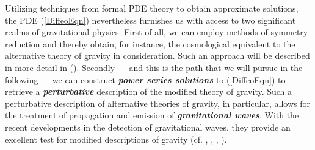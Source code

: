\documentclass[%
 reprint,
nofootinbib,
 amsmath,amssymb,
 aps,
 prd,
floatfix,
]{revtex4-2}
\begin{document}
Utilizing techniques from formal PDE theory to obtain approximate solutions, the PDE (\ref{DiffeoEqn}) nevertheless furnishes us with access to two significant realms of gravitational physics. First of all, we can employ methods of symmetry reduction and thereby obtain, for instance, the cosmological equivalent to the alternative theory of gravity in consideration. Such an approach will be described in more detail in (\cite{NilsPHD}).
Secondly --- and this is the path that we will pursue in the following --- we can construct \textit{\textbf{power series solutions}} to (\ref{DiffeoEqn}) to retrieve a \textbf{\textit{perturbative}} description of the modified theory of gravity. Such a perturbative description of alternative theories of gravity, in particular, allows for the treatment of propagation and emission of \textit{\textbf{gravitational waves}}.
With the recent developments in the detection of gravitational waves, they provide an excellent test for modified descriptions of gravity (cf. \cite{2010PhRvD..81f4008Y}, \cite{2011PhRvD..83j4022B}, \cite{2017PhRvD..95j4027Z}, \cite{2013LRR....16....9Y} ).
\end{document}
